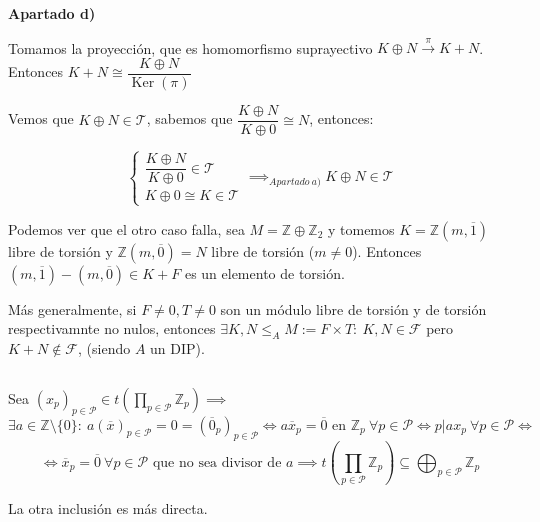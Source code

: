 \documentclass[openany]{book}
\begin{document}
\begin{exercise}
    \begin{flushright}
        \textbf{Apartado d)}
    \end{flushright}
    
    Tomamos la proyección, que es homomorfismo suprayectivo $ K \oplus N \xrightarrow{\pi } K + N$. Entonces $ K + N \cong \dfrac{K \oplus N}{\operatorname{Ker}(\pi)}$

    Vemos que $ K \oplus N \in \mathcal{T}$, sabemos que $ \dfrac{K \oplus N}{K \oplus 0} \cong N$, entonces:

    $$ \left\{
    \begin{array}{l}
        \dfrac{K \oplus N}{K \oplus 0} \in \mathcal{T}\\ 
        K \oplus 0 \cong K \in \mathcal{T}
    \end{array}
    \right. 
    \implies_{Apartado\ a)} K \oplus N \in \mathcal{T}
    $$

    Podemos ver que el otro caso falla, sea $ M = \mathbb{Z} \oplus \mathbb{Z}_{2}$ y tomemos $ K = \mathbb{Z}(m, \overline{1})$ libre de torsión y $ \mathbb{Z}(m,\overline{0}) = N$ libre de torsión ($ m \ne 0$). Entonces $ (m,\overline{1})-(m,\overline{0}) \in K + F$ es un elemento de torsión. 

    Más generalmente, si $ F \ne 0, T \ne 0$ son un módulo libre de torsión y de torsión respectivamnte no nulos, entonces $ \exists  K,N \leq_{A} M := F \times T:\ K,N \in \mathcal{F} $ pero $ K + N \not \in \mathcal{F}$, (siendo $ A$ un DIP).

\end{exercise}

\begin{exercise}
   $ $ 

   Sea $ (x_{p})_{p \in \mathcal{P}} \in t\left(\prod_{p \in \mathcal{P}}^{}\mathbb{Z}_{p}\right)\implies$
   $$ \exists  a \in \mathbb{Z} \setminus \{0\} :\ a(\overline{x})_{p \in \mathcal{P}} = 0 = (\overline{0}_{p})_{p \in \mathcal{P}} \iff a \overline{x}_{p} = \overline{0} \text{ en }\mathbb{Z}_{p} \ \forall p \in \mathcal{P} \iff p| ax_{p} \ \forall p \in \mathcal{P} \iff $$
   $$\iff\overline{x}_{p} = \overline{0} \ \forall p \in \mathcal{P} \text{ que no sea divisor de }a  \implies t \left( \prod_{p \in \mathcal{P}}^{}\mathbb{Z}_{p} \right)  \subseteq  \bigoplus_{p \in \mathcal{P}} \mathbb{Z}_{p}$$

   La otra inclusión es más directa.

\end{exercise}
\end{document}
